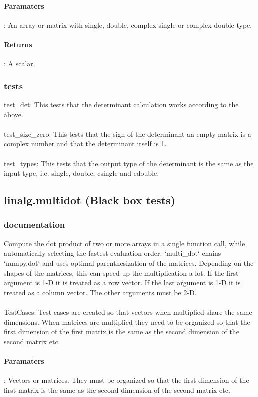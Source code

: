 \documentclass[a4paper,11pt]{article}
\begin{document}
\paragraph{Paramaters}: An array or matrix with single, double, complex single or complex double type. 
\paragraph{Returns}: A scalar. 
\subsubsection{tests}
test\_det: This tests that the determinant calculation works according to the above. \\
\\
test\_size\_zero: This tests that the sign of the determinant an empty matrix is a complex number and that the determinant itself is 1. \\
\\
test\_types: This tests that the output type of the determinant is the same as the input type, i.e. single, double, csingle and cdouble. 

\subsection{linalg.multidot (Black box tests)}
\subsubsection{documentation}
Compute the dot product of two or more arrays in a single function call, while automatically selecting the fastest evaluation order. `multi\_dot` chains `numpy.dot` and uses optimal parenthesization of the matrices. Depending on the shapes of the matrices, this can speed up the multiplication a lot. If the first argument is 1-D it is treated as a row vector. If the last argument is 1-D it is treated as a column vector. The other arguments must be 2-D.\\
\\
TestCases: Test cases are created so that vectors when multiplied share the same dimensions. When matrices are multiplied they need to be organized so that the first dimension of the first matrix is the same as the second dimension of the second matrix etc. 
\paragraph{Paramaters}: Vectors or matrices. They must be organized so that the first dimension of the first matrix is the same as the second dimension of the second matrix etc. 
\end{document}

